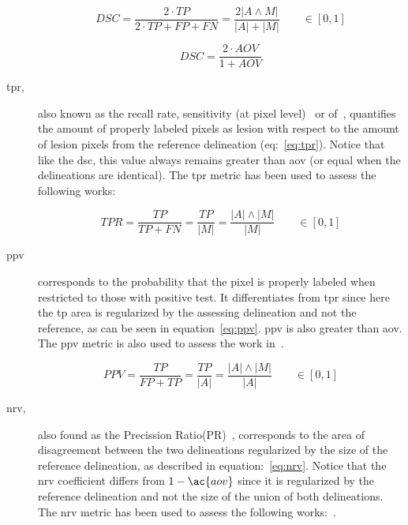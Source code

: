 \documentclass[authoryear,preprint,review,12pt]{elsarticle}
\begin{document}
\begin{description}
\begin{equation}\label{eq:dsc}
DSC=\frac{2 \cdot TP}{2 \cdot TP + FP + FN}=\frac{2 | A \wedge M |}{|A| + |M|} \qquad \in [0,1]
\end{equation}

\begin{equation}\label{eq:dsc2jsc}
DSC=\frac{2 \cdot AOV}{1+AOV}
\end{equation}

\item[\acf{tpr},]
also known as the recall rate, sensitivity (at pixel level)~\cite{gerard2013,Jiang:2012p14354} or \ac{of}~\cite{Huang:2007p6100}, quantifies the amount of properly labeled pixels as lesion with respect to the amount of lesion pixels from the reference delineation (eq:~\ref{eq:tpr}). Notice that like the \ac{dsc}, this value always remains greater than \ac{aov} (or equal when the delineations are identical). The \ac{tpr} metric has been used to assess the following works:~\cite{Madabhushi:2003p6036,Huang:2007p6100,Shan:2012p14347,Jiang:2012p14354,Huang:2005p11636,Huang:2012p14313,Liu:2010p14328,Yeh:2009p11985}


\begin{equation}\label{eq:tpr}
TPR = \frac{TP}{TP+FN}= \frac{TP}{|M|} = \frac{|A| \wedge |M|}{|M|} \qquad \in [0,1]
\end{equation}

\item[\acf{ppv}]
corresponds to the probability that the pixel is properly labeled when restricted to those with positive test. It differentiates from \ac{tpr} since here the \ac{tp} area is regularized by the assessing delineation and not the reference, as can be seen in equation~\ref{eq:ppv}. \ac{ppv} is also greater than \ac{aov}. The \ac{ppv} metric is also used to assess the work in~\cite{gerard2013}.

\begin{equation}\label{eq:ppv}
PPV= \frac{TP}{FP+TP} = \frac{TP}{|A|}=\frac{|A| \wedge |M|}{|A|} \qquad \in [0,1]
\end{equation}


\item[\acf{nrv},]
also found as the Precission Ratio(PR)~\cite{Huang:2004p2092}, corresponds to the area of disagreement between the two delineations regularized by the size of the reference delineation, as described in equation:~\ref{eq:nrv}. Notice that the \ac{nrv} coefficient differs from $1-\ac{aov}$ since it is regularized by the reference delineation and not the size of the union of both delineations.
The \ac{nrv} metric has been used to assess the following works:~\cite{Gomez:2010p14339,Liu:2005p14341,Huang:2004p2092}.



\end{description}
\end{document}
